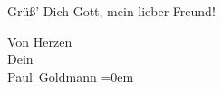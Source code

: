\pstart
           Grüß’ Dich Gott, mein lieber Freund!\pend
           
\pstart
           Von Herzen {\\[\baselineskip]}Dein {\\[\baselineskip]}\spacefill\mbox{Paul Goldmann}\pend
           \leftskip=0em{}\endnumbering{}  \newcommand{\dateiname}{L02768}\newcommand{\titel}{Paul Goldmann an Arthur Schnitzler, 22. 3. [1896]}\newcommand{\editorInnen}{Martin Anton Müller und Laura Untner}
